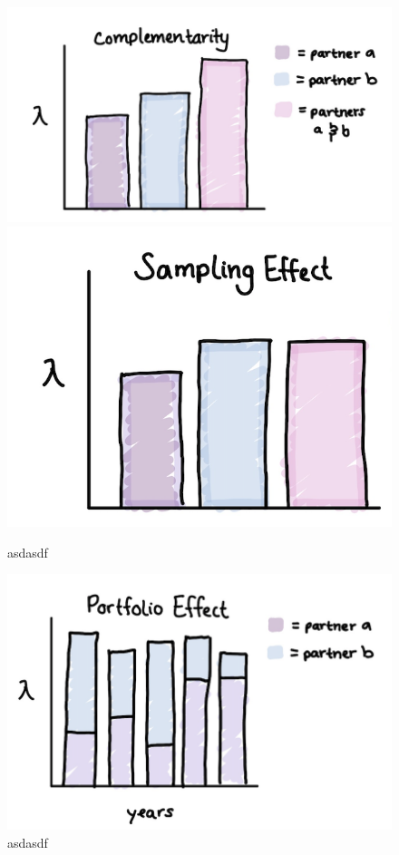 \documentclass[12pt,a4paper]{article}
\begin{document}
\begin{figure}[h]
	\includegraphics[width=0.58\linewidth]{complementarity.png}
	\includegraphics[width=0.40\linewidth]{sampling_effect.png}
	\caption{asdasdf}
	\label{fig:comp-samp}
\end{figure}
\begin{figure}[h]
	\includegraphics[width=0.60\linewidth]{portfolio_effect.png}
	\caption{asdasdf}
	\label{fig:portfolio}
\end{figure}
\end{document}
